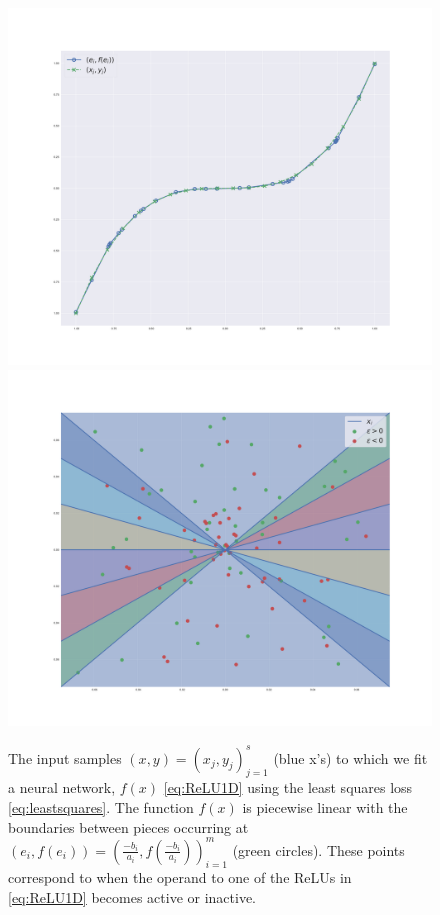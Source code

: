 \begin{figure}
    \centering
    \includegraphics[width=\textwidth]{figures/knots2.pdf}
    \endminipage\hfill
    \includegraphics[width=\textwidth]{figures/phaseplot_eg.pdf}
    \endminipage\hfill
    
    
    \caption{The input samples $(x, y) = (x_j, y_j)_{j=1}^s$ (blue x's) to which we fit a neural network, $f(x)$ \eqref{eq:ReLU1D} using the least squares loss \eqref{eq:leastsquares}. The function $f(x)$ is piecewise linear with the boundaries between pieces occurring at $(e_i, f(e_i)) = (\frac{-b_i}{a_i}, f(\frac{-b_i}{a_i}))_{i=1}^m$ (green circles). These points correspond to when the operand to one of the ReLUs in \eqref{eq:ReLU1D} becomes active or inactive.}
    \label{fig:knots}
\end{figure}
